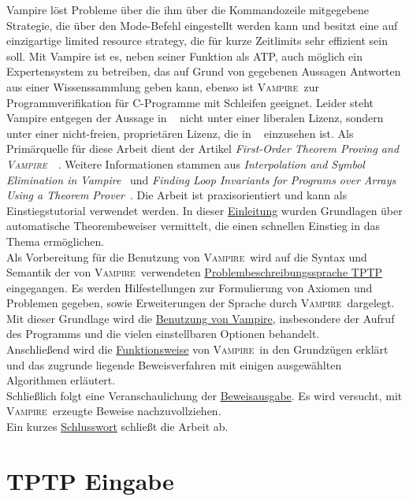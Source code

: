 \documentclass{article}
\newcommand{\vampire}{\textsc{Vampire}~}
\begin{document}
Vampire löst Probleme über die ihm über die Kommandozeile mitgegebene Strategie, die über den Mode-Befehl eingestellt werden kann und besitzt eine auf einzigartige limited resource strategy, die für kurze Zeitlimits sehr effizient sein soll. Mit Vampire ist es, neben seiner Funktion als ATP, auch möglich ein Expertensystem zu betreiben, das auf Grund von gegebenen Aussagen Antworten aus einer Wissenssammlung geben kann, ebenso ist \vampire zur Programmverifikation für C-Programme mit Schleifen geeignet. 
Leider steht Vampire entgegen der Aussage in ~\cite{cav2013} nicht unter einer liberalen Lizenz, sondern unter einer nicht-freien, proprietären Lizenz, die in ~\cite{vampirehp} einzusehen ist.
Als Primärquelle für diese Arbeit dient der Artikel \textit{First-Order Theorem Proving and \vampire}~\cite{cav2013}.
Weitere Informationen stammen aus \textit{Interpolation and Symbol Elimination in Vampire}~\cite{hoder2010} 
und \textit{Finding Loop Invariants for Programs over Arrays Using a Theorem Prover}~\cite{kovacs2009finding}.
Die Arbeit ist praxisorientiert und kann als Einstiegstutorial verwendet werden.
In dieser \hyperref[sec:introduction]{Einleitung} wurden Grundlagen über automatische Theorembeweiser vermittelt, die einen schnellen Einstieg in das Thema ermöglichen.\\
Als Vorbereitung für die Benutzung von \vampire wird auf die Syntax und Semantik der von \vampire verwendeten \hyperref[sec:input]{Problembeschreibungssprache TPTP} eingegangen. Es werden Hilfestellungen zur Formulierung von Axiomen und Problemen gegeben, sowie Erweiterungen der Sprache durch \vampire dargelegt.
Mit dieser Grundlage wird die \hyperref[sec:invocation]{Benutzung von Vampire}, insbesondere der Aufruf des Programms und die vielen einstellbaren Optionen behandelt.\\
Anschließend wird die \hyperref[sec:mechanics]{Funktionsweise} von \vampire in den Grundzügen erklärt und das zugrunde liegende Beweisverfahren mit einigen ausgewählten Algorithmen erläutert.\\
Schließlich folgt eine Veranschaulichung der \hyperref[sec:output]{Beweisausgabe}. Es wird versucht, mit \vampire erzeugte Beweise nachzuvollziehen.\\
Ein kurzes \hyperref[sec:conclusion]{Schlusswort} schließt die Arbeit ab.



\section{TPTP Eingabe}
\label{sec:input}
\end{document}
